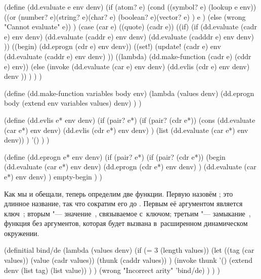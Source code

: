 \begin{code:lisp}
(define (dd.evaluate e env denv)
  (if (atom? e)
      (cond ((symbol? e) (lookup e env))
            ((or (number? e)(string? e)(char? e)
                 (boolean? e)(vector? e) )
             e )
            (else (wrong "Cannot evaluate" e)) )
      (case (car e)
        ((quote)  (cadr e))
        ((if)     (if (dd.evaluate (cadr e) env denv)
                      (dd.evaluate (caddr e) env denv)
                      (dd.evaluate (cadddr e) env denv) ))
        ((begin)  (dd.eprogn (cdr e) env denv))
        ((set!)   (update! (cadr e) env
                           (dd.evaluate (caddr e) env denv) ))
        ((lambda) (dd.make-function (cadr e) (cddr e) env))
        (else (invoke (dd.evaluate (car e) env denv)
                      (dd.evlis (cdr e) env denv)
                      denv )) ) ) )

(define (dd.make-function variables body env)
  (lambda (values denv)
    (dd.eprogn body (extend env variables values) denv) ) )

(define (dd.evlis e* env denv)
  (if (pair? e*)
      (if (pair? (cdr e*))
          (cons (dd.evaluate (car e*) env denv)
                (dd.evlis (cdr e*) env denv) )
          (list (dd.evaluate (car e*) env denv)) )
      '() ) )

(define (dd.eprogn e* env denv)
  (if (pair? e*)
      (if (pair? (cdr e*))
          (begin (dd.evaluate (car e*) env denv)
                 (dd.eprogn (cdr e*) env denv) )
          (dd.evaluate (car e*) env denv) )
      empty-begin ) )
\end{code:lisp}

Как мы и обещали, теперь определим две функции. Первую назовём
; это длинное название, так что сократим его до
. Первым её аргументом является ключ~; вторым "---
значение~, связываемое с~ключом; третьим "--- замыкание~,
функция без аргументов, которая будет вызвана в~расширенном динамическом
окружении.

\begin{code:lisp}
(definitial bind/de
  (lambda (values denv)
    (if (= 3 (length values))
        (let ((tag   (car values))
              (value (cadr values))
              (thunk (caddr values)) )
          (invoke thunk '()
                  (extend denv (list tag) (list value)) ) )
        (wrong "Incorrect arity" 'bind/de) ) ) )
\end{code:lisp}

